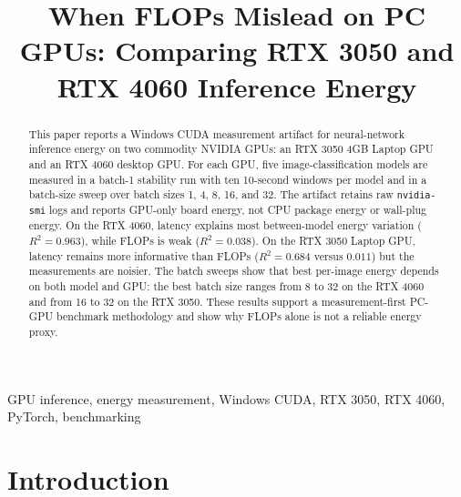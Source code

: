 \documentclass[conference]{IEEEtran}
\begin{document}
\title{When FLOPs Mislead on PC GPUs: Comparing RTX 3050 and RTX 4060 Inference Energy}

\author{
\and
{}
}

\maketitle

\begin{abstract}
This paper reports a Windows CUDA measurement artifact for neural-network
inference energy on two commodity NVIDIA GPUs: an RTX 3050 4GB Laptop GPU and
an RTX 4060 desktop GPU. For each GPU, five image-classification models are
measured in a batch-1 stability run with ten 10-second windows per model and
in a batch-size sweep over batch sizes 1, 4, 8, 16, and 32. The artifact
retains raw \texttt{nvidia-smi} logs and reports GPU-only board energy, not CPU
package energy or wall-plug energy. On the RTX 4060, latency explains most
between-model energy variation ($R^2=0.963$), while FLOPs is weak
($R^2=0.038$). On the RTX 3050 Laptop GPU, latency remains more informative
than FLOPs ($R^2=0.684$ versus $0.011$) but the measurements are noisier. The
batch sweeps show that best per-image energy depends on both model and GPU:
the best batch size ranges from 8 to 32 on the RTX 4060 and from 16 to 32 on
the RTX 3050. These results support a measurement-first PC-GPU benchmark
methodology and show why FLOPs alone is not a reliable energy proxy.
\end{abstract}

\begin{IEEEkeywords}
GPU inference, energy measurement, Windows CUDA, RTX 3050, RTX 4060, PyTorch,
benchmarking
\end{IEEEkeywords}

\section{Introduction}
\end{document}
